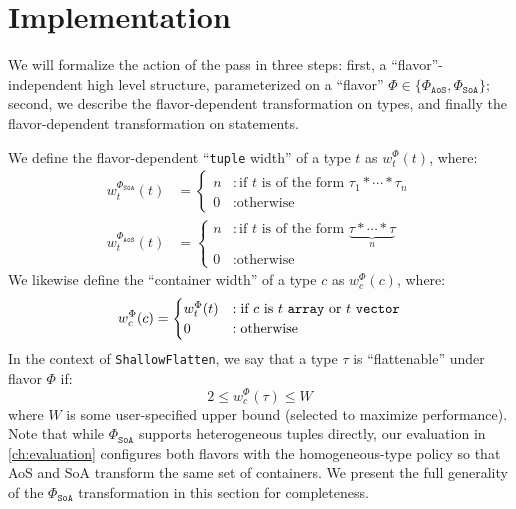 
\section{Implementation}
We will formalize the action of the pass in three steps: first, a
``flavor''-independent high level structure, parameterized on a ``flavor''
$\Phi \in \{\Phi_\texttt{AoS}, \Phi_\texttt{SoA}\}$; second, we describe the
flavor-dependent transformation on types, and finally the flavor-dependent
transformation on statements.

We define the flavor-dependent ``\texttt{tuple} width'' of a type $t$ as
$w_t^\Phi(t)$, where:
\[
\begin{aligned}
w_t^{\Phi_{\texttt{SoA}}}(t) &=
\begin{cases}
n &: \textrm{if $t$ is of the form $\tau_1 * \cdots * \tau_n$} \\
0 &: \textrm{otherwise}
\end{cases} \\[4pt]
w_t^{\Phi_{\texttt{AoS}}}(t) &=
\begin{cases}
n &: \textrm{if $t$ is of the form $\underbrace{\tau * \cdots * \tau}_{n}$} \\
0 &: \textrm{otherwise}
\end{cases}
\end{aligned}
\]
We likewise define the ``container width'' of a type $c$ as $w_c^\Phi(c)$, where:
\[
w_c^\Phi(c) =
\begin{cases}
w_t^\Phi(t) &: \textrm{if $c$ is $t$ \texttt{array} or $t$ \texttt{vector}} \\
0 &: \textrm{otherwise}
\end{cases}
\]
In the context of \texttt{ShallowFlatten}, we say that a type $\tau$ is
``flattenable'' under flavor $\Phi$ if:
\[
2 \leq w_c^\Phi(\tau) \leq W
\]
where $W$ is some user-specified upper bound (selected to maximize performance).
Note that while $\Phi_{\texttt{SoA}}$ supports heterogeneous tuples directly,
our evaluation in \cref{ch:evaluation} configures both flavors with the
homogeneous-type policy so that AoS and SoA transform the same set of
containers. We present the full generality of the $\Phi_{\texttt{SoA}}$
transformation in this section for completeness.

